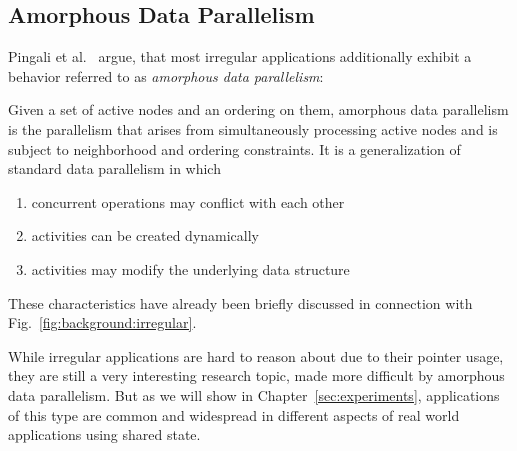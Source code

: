 \subsection{Amorphous Data Parallelism}
\label{sec:background:irregular:adp}

Pingali et al.~\cite{pingali2009amorphous} argue, that most irregular applications additionally exhibit a behavior referred to as \emph{amorphous data parallelism}:

Given a set of active nodes and an ordering on them, amorphous data parallelism is the parallelism that arises from simultaneously processing active nodes and is subject to neighborhood and ordering constraints.
It is a generalization of standard data parallelism in which
\begin{enumerate}
    \item concurrent operations may conflict with each other
    \item activities can be created dynamically
    \item activities may modify the underlying data structure
\end{enumerate}
These characteristics have already been briefly discussed in connection with Fig.~\ref{fig:background:irregular}.

While irregular applications are hard to reason about due to their pointer usage, they are still a very interesting research topic, made more difficult by amorphous data parallelism.
But as we will show in Chapter~\ref{sec:experiments}, applications of this type are common and widespread in different aspects of real world applications using shared state.





